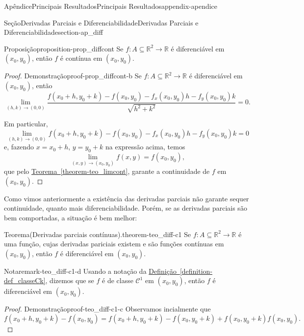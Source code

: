 \documentclass[oneside,10pt,]{book}
\newcommand{\xreffont}{\relax}
\numberwithin{equation}{section}
\newcommand{\R}{\mathbb R}
\begin{document}
\begin{appendixptx}{Apêndice}{Principais Resultados}{}{Principais Resultados}{}{}{appendix-apendice}
\begin{sectionptx}{Seção}{Derivadas Parciais e Diferenciabilidade}{}{Derivadas Parciais e Diferenciabilidade}{}{}{section-ap_diff}
\begin{proposition}{Proposição}{}{}{proposition-prop_diffcont}%
Se \(f\colon A\subseteq\R^2\to\R\) é diferenciável em \((x_0,y_0)\), então \(f\) é contínua em \((x_0,y_0)\).%
\end{proposition}
\begin{proof}{Demonstração}{}{proof-prop_diffcont-b}
Se \(f\colon A\subseteq\R^2\to\R\) é diferenciável em \((x_0,y_0)\), então%
\begin{equation*}
\lim\limits_{(h,k)\to(0,0)}
\dfrac{f(x_0+h,y_0+k)-f(x_0,y_0)-f_x(x_0,y_0)h-f_y(x_0,y_0)k}
{\sqrt{h^2+k^2}}=0.
\end{equation*}
%
\par
Em particular,%
\begin{equation*}
\lim\limits_{(h,k)\to(0,0)}
f(x_0+h,y_0+k)-f(x_0,y_0)-f_x(x_0,y_0)h-f_y(x_0,y_0)k=0
\end{equation*}
e, fazendo \(x=x_0+h\), \(y=y_0+k\) na expressão acima, temos%
\begin{equation*}
\lim\limits_{(x,y)\to(x_0,y_0)}
f(x,y)=f(x_0,y_0),
\end{equation*}
que pelo \hyperref[theorem-teo_limcont]{Teorema~{\xreffont\ref{theorem-teo_limcont}}}, garante a continuidade de \(f\) em \((x_0,y_0)\).%
\end{proof}
Como vimos anteriormente a existência das derivadas parciais não garante sequer continuidade, quanto mais diferenciabilidade. Porém, se as derivadas parciais são bem comportadas, a situação é bem melhor:%
\begin{theorem}{Teorema}{(Derivadas parciais contínuas).}{}{theorem-teo_diff-c1}%
Se \(f\colon A\subseteq\R^2\to\R\) é uma função, cujas derivadas pariciais existem e são funções contínuas em \((x_0,y_0)\), então \(f\) é diferenciável em \((x_0,y_0)\).%
\begin{remark}{Nota}{}{remark-teo_diff-c1-d}%
Usando a notação da \hyperref[definition-def_classeCk]{Definição~{\xreffont\ref{definition-def_classeCk}}}, dizemos que se \(f\) é de classe \(\mathscr{C}^1\) em \((x_0,y_0)\), então \(f\) é diferenciável em \((x_0,y_0)\).\end{remark}
\end{theorem}
\begin{proof}{Demonstração}{}{proof-teo_diff-c1-c}
Observamos incialmente que%
\begin{equation*}
f(x_0+h,y_0+k)-f(x_0,y_0)=f(x_0+h,y_0+k)-f(x_0,y_0+k)
+f(x_0,y_0+k)f(x_0,y_0).
\end{equation*}
%
\par

\end{proof}
\end{sectionptx}
\end{appendixptx}
\end{document}

